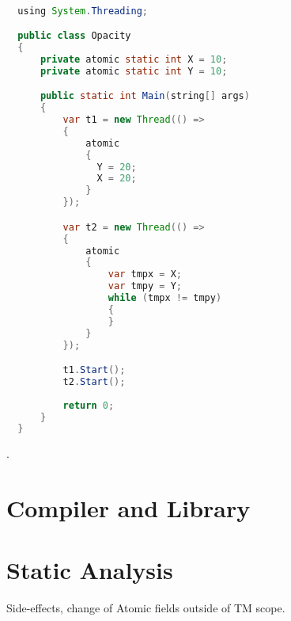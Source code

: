 \begin{lstlisting}[label=lst:stm_opacity,
  caption={Opacity example},
  language=Java,  
  showspaces=false,
  showtabs=false,
  breaklines=true,
  showstringspaces=false,
  breakatwhitespace=true,
  commentstyle=\color{greencomments},
  keywordstyle=\color{bluekeywords},
  stringstyle=\color{redstrings},
  morekeywords={atomic, retry, orelse, var, get, set, using}]  % Start your code-block

  using System.Threading;

  public class Opacity
  {
      private atomic static int X = 10;
      private atomic static int Y = 10;

      public static int Main(string[] args)
      {
          var t1 = new Thread(() =>
          {
              atomic
              {
                Y = 20;
                X = 20;
              }
          });

          var t2 = new Thread(() =>
          {
              atomic
              {
                  var tmpx = X;
                  var tmpy = Y;
                  while (tmpx != tmpy)
                  {
                  }
              }
          });

          t1.Start();
          t2.Start();
        
          return 0;
      }
  }
\end{lstlisting}

.
\section{Compiler and Library}
\section{Static Analysis}
Side-effects, change of Atomic fields outside of TM scope.

\worksheetend